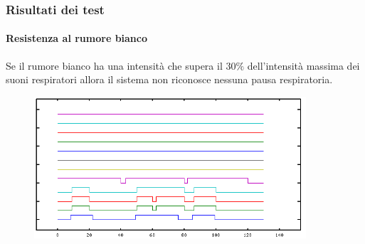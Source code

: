 \begin{frame}
  \frametitle{Risultati dei test}
  \framesubtitle{Resistenza al rumore bianco}
Se il rumore bianco ha una intensit\`a che supera il $30\%$ dell'intensit\`a massima dei suoni respiratori allora il sistema non riconosce nessuna pausa respiratoria.
  \begin{figure}
 \centering
 \includegraphics[width=0.9\textwidth]{./testWhiteNoise.png}
\end{figure}
% 

\end{frame}
